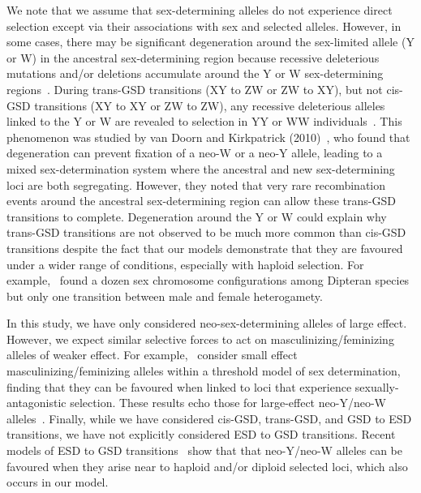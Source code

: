 \documentclass[10pt,letterpaper]{article}
\begin{document}
We note that we assume that sex-determining alleles do not experience direct selection except via their associations with sex and selected alleles.
However, in some cases, there may be significant degeneration around the sex-limited allele (Y or W) in the ancestral sex-determining region because recessive deleterious mutations and/or deletions accumulate around the Y or W sex-determining regions~\cite{Rice:1996ke,Charlesworth:2000cc,Bachtrog:2006ed,Marais:2008hm}. 
During trans-GSD transitions (XY to ZW or ZW to XY), but not cis-GSD transitions (XY to XY or ZW to ZW), any recessive deleterious alleles linked to the Y or W are revealed to selection in YY or WW individuals~\cite{Bachtrog:2014bx}. 
This phenomenon was studied by van Doorn and Kirkpatrick (2010)~\cite{vanDoorn:2010hu}, who found that degeneration can prevent fixation of a neo-W or a neo-Y allele, leading to a mixed sex-determination system where the ancestral and new sex-determining loci are both segregating. 
However, they noted that very rare recombination events around the ancestral sex-determining region can allow these trans-GSD transitions to complete.  
Degeneration around the Y or W could explain why trans-GSD transitions are not observed to be much more common than cis-GSD transitions despite the fact that our models demonstrate that they are favoured under a wider range of conditions, especially with haploid selection. 
For example,~\cite{Vicoso:2015hf} found a dozen sex chromosome configurations among Dipteran species but only one transition between male and female heterogamety. 

In this study, we have only considered neo-sex-determining alleles of large effect. 
However, we expect similar selective forces to act on masculinizing/feminizing alleles of weaker effect. 
For example,~\cite{Muralidhar2018} consider small effect masculinizing/feminizing alleles within a threshold model of sex determination, finding that they can be favoured when linked to loci that experience sexually-antagonistic selection. 
These results echo those for large-effect neo-Y/neo-W alleles~\cite{vanDoorn:2007eu,vanDoorn:2010hu}.
Finally, while we have considered cis-GSD, trans-GSD, and GSD to ESD transitions, we have not explicitly considered ESD to GSD transitions. 
Recent models of ESD to GSD transitions~\cite{Ubeda:2015fx,Muralidhar2018} show that that neo-Y/neo-W alleles can be favoured when they arise near to haploid and/or diploid selected loci, which also occurs in our model. 
\end{document}
